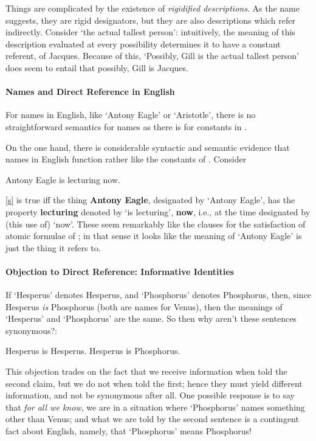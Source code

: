 Things are complicated by the existence of \emph{rigidified descriptions}. As the name suggests, they are rigid designators, but they are also descriptions which refer indirectly. Consider ‘the actual tallest person’: intuitively, the meaning of this description evaluated at every possibility determines it to have a constant referent, of Jacques. Because of this, ‘Possibly, Gill is the actual tallest person’ does seem to entail that possibly, Gill is Jacques. 
	


\paragraph{Names and Direct Reference in English}
For names in English, like `Antony Eagle' or `Aristotle', there is no straightforward semantics for names as there is for constants in \ltwo.

On the one hand, there is considerable syntactic and semantic evidence that names in English function rather like the constants of \ltwo. Consider \begin{exe}
	\ex Antony Eagle is lecturing now.\label{s}
\end{exe}  \ref{s} is true  iff the thing \textbf{Antony Eagle}, designated by `Antony Eagle', has the property \textbf{lecturing} denoted by `is lecturing', \textbf{now}, i.e., at the time designated by (this use of) `now'. These seem remarkably like the clauses for the satisfaction of atomic formulae of \ltwo; in that sense it looks like the meaning of `Antony Eagle' is just the thing it refers to.

\paragraph{Objection to Direct Reference: Informative Identities}
 If `Hesperus' denotes Hesperus, and `Phosphorus' denotes Phosphorus, then, since Hesperus \emph{is} Phosphorus (both are names for Venus), then the meanings of `Hesperus' and `Phosphorus' are the same. So then why aren't these sentences synonymous?: \begin{exe}
		\ex Hesperus is Hesperus.
		\ex Hesperus is Phosphorus.
	\end{exe}



This objection trades on the fact that we receive information when told the second claim, but we do not when told the first; hence they must yield different information, and not be synonymous after all. One possible response is to say that \emph{for all we know}, we are in a situation where `Phosphorus' names something other than Venus; and what we are told by the second sentence is a contingent fact about English, namely, that `Phosphorus' means Phosphorus!

